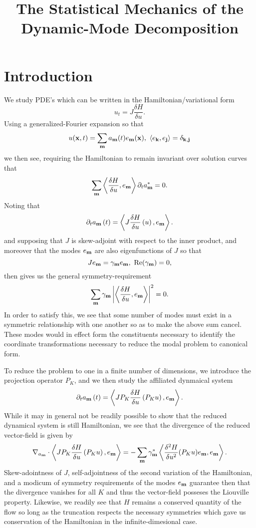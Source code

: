 \documentclass[aps,prl,preprint,groupedaddress]{revtex4-1}
\title{The Statistical Mechanics of the Dynamic-Mode Decomposition}
\newcommand{\pd}{\partial}
\begin{document}
\section*{Introduction}

We study PDE's which can be written in the Hamiltonian/variational form
\[
u_{t} = J\frac{\delta H}{\delta u}.
\]
Using a generalized-Fourier expansion so that 
\[
u({\bf x},t) = \sum_{{\bf m}}a_{{\bf m}}(t) e_{{\bf m}}({\bf x}), ~ \left<e_{{\bf k}},e_{{\bf j}}\right> = \delta_{{\bf k},{\bf j}}
\]
we then see, requiring the Hamiltonian to remain invariant over solution curves that
\[
\sum_{{\bf m}} \left<\frac{\delta H}{\delta u}, e_{{\bf m}} \right>\pd_{t}a^{\ast}_{{\bf m}} = 0.
\]
Noting that 
\[
\pd_{t}a_{{\bf m}}\left(t\right) = \left<J \frac{\delta H}{\delta u}\left( u \right),e_{\bf m}\right>.
\]
and supposing that $J$ is skew-adjoint with respect to the inner product, and moreover that the modes $e_{{\bf m}}$ are also eigenfunctions of $J$ so that 
\[
Je_{{\bf m}} = \gamma_{{\bf m}}e_{{\bf m}}, ~ \mbox{Re}(\gamma_{{\bf m}}) = 0, 
\]
then gives us the general symmetry-requirement
\[
\sum_{{\bf m}} \gamma_{{\bf m}}\left|\left<\frac{\delta H}{\delta u}, e_{{\bf m}} \right>\right|^{2} = 0.
\]
In order to satisfy this, we see that some number of modes must exist in a symmetric relationship with one another so as to make the above sum cancel.  These modes would in effect form the constituents necessary to identify the coordinate transformations necessary to reduce the modal problem to canonical form.  

To reduce the problem to one in a finite number of dimensions, we introduce the projection operator $P_{K}$, and we then study the affiliated dynmaical system
\[
\pd_{t}a_{{\bf m}}\left(t\right) = \left<J P_{K}\frac{\delta H}{\delta u}\left( P_{K}u \right),e_{\bf m}\right>.
\]
While it may in general not be readily possible to show that the reduced dynamical system is still Hamiltonian, we see that the divergence of the reduced vector-field is given by
\[
\nabla_{a_{{\bf m}}} \cdot \left<JP_{K}\frac{\delta H}{\delta u}\left(P_{K} u \right),e_{\bf m}\right> = -\sum_{{\bf m}}\gamma^{\ast}_{{\bf m}}\left<\frac{\delta^{2} H}{\delta u^{2}}(P_{K}u)e_{{\bf m}},e_{{\bf m}} \right>.
\]
Skew-adointness of $J$, self-adjointness of the second variation of the Hamiltonian, and a modicum of symmetry requirements of the modes $e_{{\bf m}}$ guarantee then that the divergence vanishes for all $K$ and thus the vector-field posseses the Liouville property.  Likewise, we readily see that $H$ remains a conserved quantity of the flow so long as the truncation respects the necessary symmetries which gave us conservation of the Hamiltonian in the infinite-dimesional case.  
\end{document}
